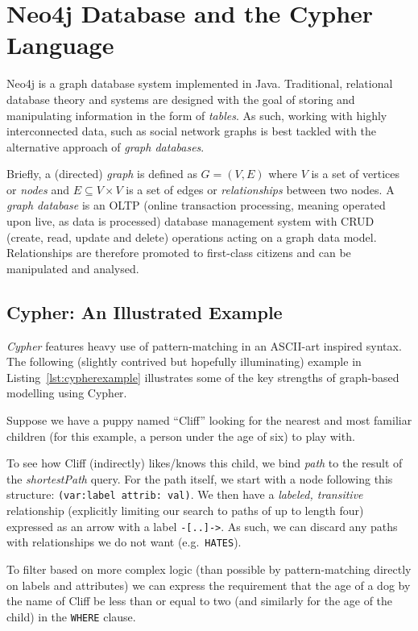 \section{Neo4j Database and the Cypher Language}

Neo4j is a graph database system implemented in Java. Traditional, relational
database theory and systems are designed with the goal of storing and
manipulating information in the form of \emph{tables}. As such, working with
highly interconnected data, such as social network graphs is best tackled with
the alternative approach of \emph{graph databases}.

Briefly, a (directed) \emph{graph} is defined as $G = (V, E)$ where $V$ is a set
of vertices or \emph{nodes} and $E \subseteq V \times V$ is a set of edges or
\emph{relationships} between two nodes. A \emph{graph database} is an OLTP
(online transaction processing, meaning operated upon live, as data is
processed) database management system with CRUD (create, read, update and delete)
operations acting on a graph data model. Relationships are therefore promoted to
first-class citizens and can be manipulated and analysed.

\subsection{Cypher: An Illustrated Example}

\emph{Cypher} features heavy use of pattern-matching in an ASCII-art inspired
syntax.  The following (slightly contrived but hopefully illuminating) example
in Listing~\ref{lst:cypherexample} illustrates some of the key strengths of
graph-based modelling using Cypher. 

Suppose we have a puppy named ``Cliff'' looking for the nearest and most
familiar children (for this example, a person under the age of six) to play
with.

To see how Cliff (indirectly) likes/knows this child, we bind \emph{path} to the
result of the \emph{shortestPath} query.  For the path itself, we start with a
node following this structure: \texttt{(var:label {attrib: val})}.
We then have a \emph{labeled, transitive} relationship (explicitly limiting our
search to paths of up to length four) expressed as an arrow with a label
\texttt{-[..]->}. As such, we can discard any paths with relationships we do not
want (e.g.\ \texttt{HATES}). 

To filter based on more complex logic (than possible by pattern-matching directly
on labels and attributes) we can express the requirement that the age of a dog by
the name of Cliff be less than or equal to two (and similarly for the age of the
child) in the \texttt{WHERE} clause.

